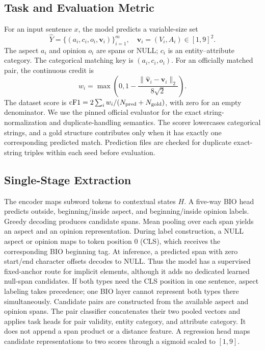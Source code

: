 \documentclass[conference]{IEEEtran}
\begin{document}
\subsection{Task and Evaluation Metric}
For an input sentence $x$, the model predicts a variable-size set
\begin{equation}
\widehat{Y}=\{(a_i,c_i,o_i,\mathbf{v}_i)\}_{i=1}^{m},\quad
\mathbf{v}_i=(V_i,A_i)\in[1,9]^2.
\end{equation}
The aspect $a_i$ and opinion $o_i$ are spans or \textsc{NULL}; $c_i$ is an entity--attribute category. The categorical matching key is $(a_i,c_i,o_i)$. For an officially matched pair, the continuous credit is
\begin{equation}
 w_i=\max\left(0,1-\frac{\|\widehat{\mathbf v}_i-\mathbf v_i\|_2}{8\sqrt{2}}\right).
\end{equation}
The dataset score is $\mathrm{cF1}=2\sum_i w_i/(N_{\rm pred}+N_{\rm gold})$, with zero for an empty denominator. We use the pinned official evaluator for the exact string-normalization and duplicate-handling semantics. The scorer lowercases categorical strings, and a gold structure contributes only when it has exactly one corresponding predicted match. Prediction files are checked for duplicate exact-string triples within each seed before evaluation.

\subsection{Single-Stage Extraction}
The encoder maps subword tokens to contextual states $H$. A five-way BIO head predicts outside, beginning/inside aspect, and beginning/inside opinion labels. Greedy decoding produces candidate spans. Mean pooling over each span yields an aspect and an opinion representation. During label construction, a NULL aspect or opinion maps to token position 0 (CLS), which receives the corresponding BIO beginning tag. At inference, a predicted span with zero start/end character offsets decodes to NULL. Thus the model has a supervised fixed-anchor route for implicit elements, although it adds no dedicated learned null-span candidates. If both types need the CLS position in one sentence, aspect labeling takes precedence; one BIO layer cannot represent both types there simultaneously. Candidate pairs are constructed from the available aspect and opinion spans. The pair classifier concatenates their two pooled vectors and applies task heads for pair validity, entity category, and attribute category. It does not append a span product or a distance feature. A regression head maps candidate representations to two scores through a sigmoid scaled to $[1,9]$.
\end{document}
